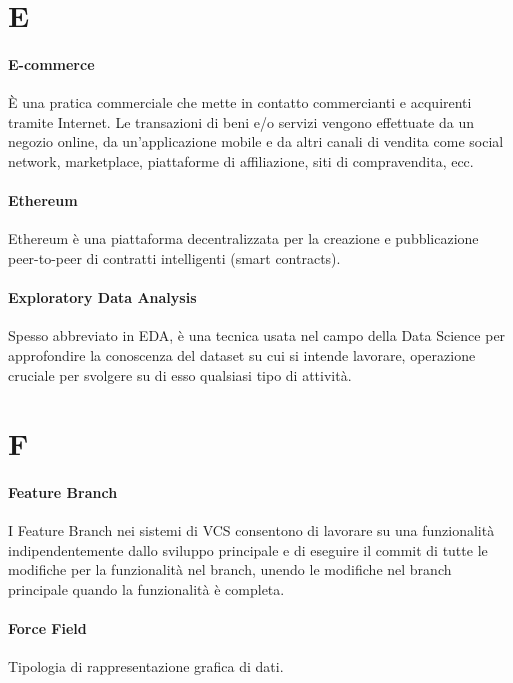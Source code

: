 \documentclass[]{article}
\begin{document}
	\newpage
	
	\section*{E}
	
	\paragraph*{E-commerce}
	È una pratica commerciale che mette in contatto commercianti e acquirenti tramite Internet. Le transazioni di beni e/o servizi vengono effettuate da un negozio online, da un'applicazione mobile e da altri canali di vendita come social network, marketplace, piattaforme di affiliazione, siti di compravendita, ecc.
	
	\paragraph*{Ethereum}
	Ethereum è una piattaforma decentralizzata per la creazione e pubblicazione peer-to-peer di contratti intelligenti (smart contracts).
	
	\paragraph*{Exploratory Data Analysis}
	Spesso abbreviato in EDA, è una tecnica usata nel campo della Data Science per approfondire la conoscenza del dataset su cui si intende lavorare, operazione cruciale per svolgere su di esso qualsiasi tipo di attività.
	
	
	\newpage
	
	\section*{F}
	
	\paragraph*{Feature Branch}
	I Feature Branch nei sistemi di VCS consentono di lavorare su una funzionalità indipendentemente dallo sviluppo principale e di eseguire il commit di tutte le modifiche per la funzionalità nel branch, unendo le modifiche nel branch principale quando la funzionalità è completa.
	
	\paragraph*{Force Field}
	Tipologia di rappresentazione grafica di dati.
	
\end{document}

